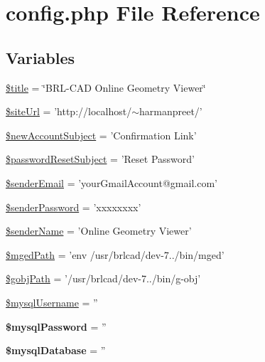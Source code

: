 \hypertarget{config_8php}{\section{config.\-php File Reference}
\label{config_8php}
}
\subsection*{Variables}
\begin{DoxyCompactItemize}
\item 
\hyperlink{config_8php_ada57e7bb7c152edad18fe2f166188691}{\$title} = \char`\"{}B\-R\-L-\/C\-A\-D Online Geometry Viewer\char`\"{}
\item 
\hyperlink{config_8php_a249f6872029172ca47702c3b887aed34}{\$site\-Url} = 'http\-://localhost/$\sim$harmanpreet/'
\item 
\hyperlink{config_8php_ab3f15af8055eef62be11f3a794841a07}{\$new\-Account\-Subject} = 'Confirmation Link'
\item 
\hyperlink{config_8php_a9adc6662fb3e02f099be0ba0628a3d16}{\$password\-Reset\-Subject} = 'Reset Password'
\item 
\hyperlink{config_8php_a540edc1edfa3f436b0f805125e69d1fa}{\$sender\-Email} = 'your\-Gmail\-Account@gmail.\-com'
\item 
\hyperlink{config_8php_ac332b0a6f5d1735f0b130d9169191189}{\$sender\-Password} = 'xxxxxxxx'
\item 
\hyperlink{config_8php_ac99178d2fd94439629e08538fd8d7e4d}{\$sender\-Name} = 'Online Geometry Viewer'
\item 
\hyperlink{config_8php_a96892bc6f442b40d6430fa776efc874c}{\$mged\-Path} = 'env /usr/brlcad/dev-\/7../bin/mged'
\item 
\hyperlink{config_8php_ad0b8e5e5771eb951767f92eae6b5fd61}{\$gobj\-Path} = '/usr/brlcad/dev-\/7../bin/g-\/obj'
\item 
\hyperlink{config_8php_a568794d7d473378056ef7746cfdffa67}{\$mysql\-Username} = ''
\item 
\hypertarget{config_8php_ac9ea54a858d047d911f6dfb2fdb88e27}{{\bfseries \$mysql\-Password} = ''}\label{config_8php_ac9ea54a858d047d911f6dfb2fdb88e27}

\item 
\hypertarget{config_8php_adb4ee14940aef8d91bf7692d87e3e013}{{\bfseries \$mysql\-Database} = ''}\label{config_8php_adb4ee14940aef8d91bf7692d87e3e013}

\end{DoxyCompactItemize}


